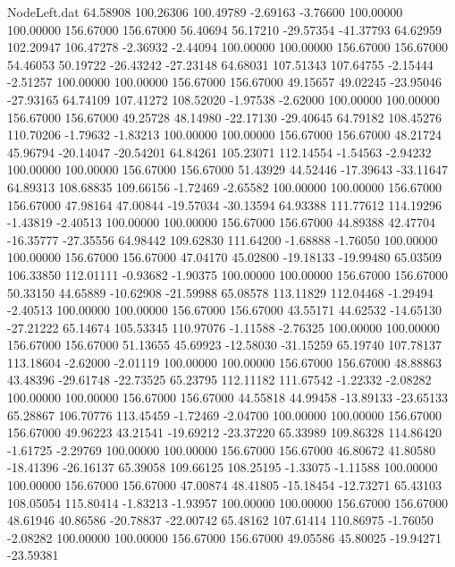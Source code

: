 \begin{filecontents}{NodeLeft.dat}
  64.58908  100.26306  100.49789    -2.69163   -3.76600  100.00000  100.00000  156.67000  156.67000   56.40694   56.17210  -29.57354  -41.37793
  64.62959  102.20947  106.47278    -2.36932   -2.44094  100.00000  100.00000  156.67000  156.67000   54.46053   50.19722  -26.43242  -27.23148
  64.68031  107.51343  107.64755    -2.15444   -2.51257  100.00000  100.00000  156.67000  156.67000   49.15657   49.02245  -23.95046  -27.93165
  64.74109  107.41272  108.52020    -1.97538   -2.62000  100.00000  100.00000  156.67000  156.67000   49.25728   48.14980  -22.17130  -29.40645
  64.79182  108.45276  110.70206    -1.79632   -1.83213  100.00000  100.00000  156.67000  156.67000   48.21724   45.96794  -20.14047  -20.54201
  64.84261  105.23071  112.14554    -1.54563   -2.94232  100.00000  100.00000  156.67000  156.67000   51.43929   44.52446  -17.39643  -33.11647
  64.89313  108.68835  109.66156    -1.72469   -2.65582  100.00000  100.00000  156.67000  156.67000   47.98164   47.00844  -19.57034  -30.13594
  64.93388  111.77612  114.19296    -1.43819   -2.40513  100.00000  100.00000  156.67000  156.67000   44.89388   42.47704  -16.35777  -27.35556
  64.98442  109.62830  111.64200    -1.68888   -1.76050  100.00000  100.00000  156.67000  156.67000   47.04170   45.02800  -19.18133  -19.99480
  65.03509  106.33850  112.01111    -0.93682   -1.90375  100.00000  100.00000  156.67000  156.67000   50.33150   44.65889  -10.62908  -21.59988
  65.08578  113.11829  112.04468    -1.29494   -2.40513  100.00000  100.00000  156.67000  156.67000   43.55171   44.62532  -14.65130  -27.21222
  65.14674  105.53345  110.97076    -1.11588   -2.76325  100.00000  100.00000  156.67000  156.67000   51.13655   45.69923  -12.58030  -31.15259
  65.19740  107.78137  113.18604    -2.62000   -2.01119  100.00000  100.00000  156.67000  156.67000   48.88863   43.48396  -29.61748  -22.73525
  65.23795  112.11182  111.67542    -1.22332   -2.08282  100.00000  100.00000  156.67000  156.67000   44.55818   44.99458  -13.89133  -23.65133
  65.28867  106.70776  113.45459    -1.72469   -2.04700  100.00000  100.00000  156.67000  156.67000   49.96223   43.21541  -19.69212  -23.37220
  65.33989  109.86328  114.86420    -1.61725   -2.29769  100.00000  100.00000  156.67000  156.67000   46.80672   41.80580  -18.41396  -26.16137
  65.39058  109.66125  108.25195    -1.33075   -1.11588  100.00000  100.00000  156.67000  156.67000   47.00874   48.41805  -15.18454  -12.73271
  65.43103  108.05054  115.80414    -1.83213   -1.93957  100.00000  100.00000  156.67000  156.67000   48.61946   40.86586  -20.78837  -22.00742
  65.48162  107.61414  110.86975    -1.76050   -2.08282  100.00000  100.00000  156.67000  156.67000   49.05586   45.80025  -19.94271  -23.59381

\end{filecontents}

